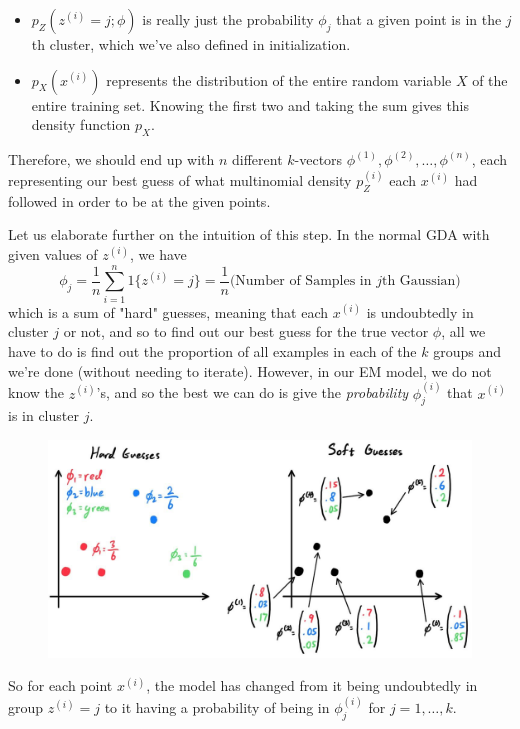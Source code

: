\documentclass{article}
\begin{document}
\begin{definition}[EM Algorithm]
\begin{enumerate}
\begin{itemize}
              \item $p_Z(z^{(i)} = j; \phi)$ is really just the probability $\phi_j$ that a given point is in the $j$th cluster, which we've also defined in initialization.
              \item $p_X(x^{(i)})$ represents the distribution of the entire random variable $X$ of the entire training set. Knowing the first two and taking the sum gives this density function $p_X$.
          \end{itemize}
          Therefore, we should end up with $n$ different $k$-vectors $\phi^{(1)}, \phi^{(2)}, \ldots, \phi^{(n)}$, each representing our best guess of what multinomial density $p_Z^{(i)}$ each $x^{(i)}$ had followed in order to be at the given points.

          Let us elaborate further on the intuition of this step. In the normal GDA with given values of $z^{(i)}$, we have
          \[\phi_j = \frac{1}{n} \sum_{i=1}^n 1\{z^{(i)} = j\} = \frac{1}{n}\big(\text{Number of Samples in }j\text{th Gaussian}\big)\]
          which is a sum of "hard" guesses, meaning that each $x^{(i)}$ is undoubtedly in cluster $j$ or not, and so to find out our best guess for the true vector $\phi$, all we have to do is find out the proportion of all examples in each of the $k$ groups and we're done (without needing to iterate). However, in our EM model, we do not know the $z^{(i)}$'s, and so the best we can do is give the \textit{probability} $\phi^{(i)}_j$ that $x^{(i)}$ is in cluster $j$.

          \begin{figure}[H]
            \centering 
            \includegraphics[scale=0.27]{img/hard_soft_guess.jpg}
            \caption{} 
            \label{fig:hard_soft_guess}
          \end{figure}

          So for each point $x^{(i)}$, the model has changed from it being undoubtedly in group $z^{(i)} = j$ to it having a probability of being in $\phi^{(i)}_j$ for $j = 1, \ldots, k$.


\end{enumerate}
\end{definition}
\end{document}
